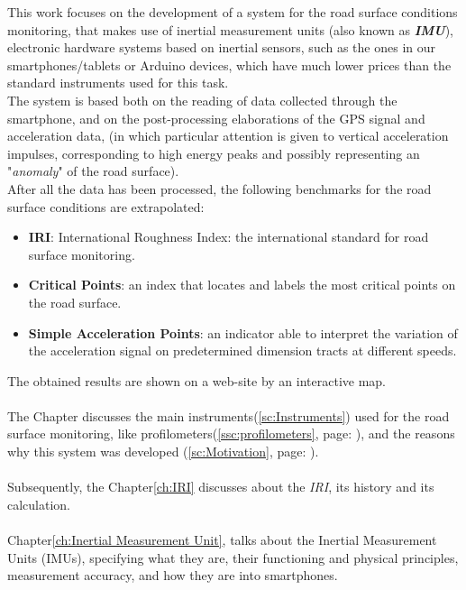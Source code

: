 \documentclass[tesi]{subfiles}
\begin{document}
\noindent
This work focuses on the development of a system for the road surface conditions monitoring, that makes use of inertial measurement units (also known as \textbf{\textit{IMU}}), electronic hardware systems based on inertial sensors, such as the ones in our smartphones/tablets or Arduino devices, which have much lower prices than the standard instruments used for this task.\\
The system is based both on the reading of data collected through the smartphone, and on the post-processing elaborations of the GPS signal and acceleration data, (in which particular attention is given to vertical acceleration impulses, corresponding to high energy peaks and possibly representing an "\textit{anomaly}" of the road surface).\\
After all the data has been processed, the following benchmarks for the road surface conditions are extrapolated:
\begin{itemize}\label{it:indexes}
\item \textbf{IRI}: International Roughness Index: the international standard for road surface monitoring.
\item \textbf{Critical Points}: an index that locates and labels the most critical points on the road surface.
\item \textbf{Simple Acceleration Points}: an indicator able to interpret the variation of the acceleration signal on predetermined dimension tracts at different speeds.
\end{itemize}
\clearpage
\noindent The obtained results are shown on a web-site by an interactive map.
\\\\
The  Chapter discusses the main instruments{\footnotesize (\ref{sc:Instruments})} used for the road surface monitoring, like profilometers{\footnotesize (\ref{ssc:profilometers}, page: \pageref{ssc:profilometers})}, and the reasons why this system was developed  {\footnotesize (\ref{sc:Motivation}, page: \pageref{sc:Motivation})}.\\\\
Subsequently, the Chapter\ref{ch:IRI} discusses about the \textit{IRI}, its history and its calculation.\\\\
Chapter\ref{ch:Inertial Measurement Unit}, talks about the Inertial Measurement Units (IMUs), specifying what they are, their functioning and physical principles, measurement accuracy, and how they are into smartphones.\\\\
\end{document}
